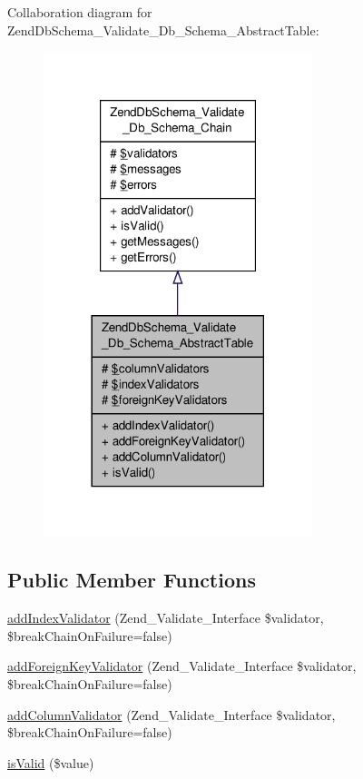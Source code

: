 Collaboration diagram for Zend\-Db\-Schema\-\_\-\-Validate\-\_\-\-Db\-\_\-\-Schema\-\_\-\-Abstract\-Table\-:\nopagebreak
\begin{figure}[H]
\begin{center}
\leavevmode
\includegraphics[width=222pt]{classZendDbSchema__Validate__Db__Schema__AbstractTable__coll__graph}
\end{center}
\end{figure}
\subsection*{Public Member Functions}
\begin{DoxyCompactItemize}
\item 
\hyperlink{classZendDbSchema__Validate__Db__Schema__AbstractTable_a9d705c1888fac4470496d51389d5fb58}{add\-Index\-Validator} (Zend\-\_\-\-Validate\-\_\-\-Interface \$validator, \$break\-Chain\-On\-Failure=false)
\item 
\hyperlink{classZendDbSchema__Validate__Db__Schema__AbstractTable_a5041226725267641018040dc53413d0c}{add\-Foreign\-Key\-Validator} (Zend\-\_\-\-Validate\-\_\-\-Interface \$validator, \$break\-Chain\-On\-Failure=false)
\item 
\hyperlink{classZendDbSchema__Validate__Db__Schema__AbstractTable_a2da72656341bb8399423219ebae1161b}{add\-Column\-Validator} (Zend\-\_\-\-Validate\-\_\-\-Interface \$validator, \$break\-Chain\-On\-Failure=false)
\item 
\hyperlink{classZendDbSchema__Validate__Db__Schema__AbstractTable_a09568c231bbb25d353f1a95ecc42146a}{is\-Valid} (\$value)
\end{DoxyCompactItemize}
